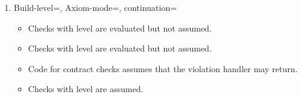 \begin{enumerate}
\item Build-level=, Axiom-mode=, continuation=
\begin{itemize}
  \item Checks with  level are evaluated but not assumed.
  \item Checks with  level are evaluated but not assumed.
  \item Code for contract checks assumes that the violation handler may return.
  \item Checks with  level are assumed.
\end{itemize}

\end{enumerate}
